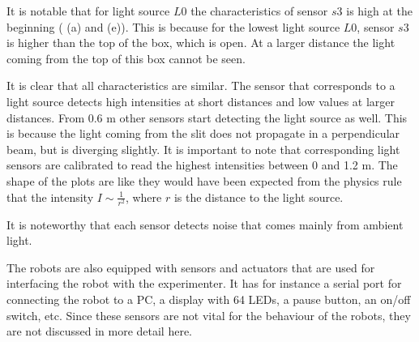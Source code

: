 \begin{description}
It is notable that for light source $L0$ the characteristics of sensor $s3$ is high at the beginning ( (a) and (e)). This is because for the lowest light source $L0$, sensor $s3$ is higher than the top of the box, which is open. At a larger distance the light coming from the top of this box cannot be seen. 

It is clear that all characteristics are similar. The sensor that corresponds to a light source detects high intensities at short distances and low values at larger distances. From 0.6 m other sensors start detecting the light source as well. This is because the light coming from the slit does not propagate in a perpendicular beam, but is diverging slightly. It is important to note that corresponding light sensors are calibrated to read the highest intensities between 0 and 1.2 m. The shape of the plots are like they would have been expected from the physics rule that the intensity $I \sim \frac{1}{r^2}$, where $r$ is the distance to the light source.

It is noteworthy that each sensor detects noise that comes mainly from ambient light.
\end{description}

The robots are also equipped with sensors and actuators that are used for interfacing the robot with the experimenter. It has for instance a serial port for connecting the robot to a PC, a display with 64 LEDs, a pause button, an on/off switch, etc. Since these sensors are not vital for the behaviour of the robots, they are not discussed in more detail here. 


